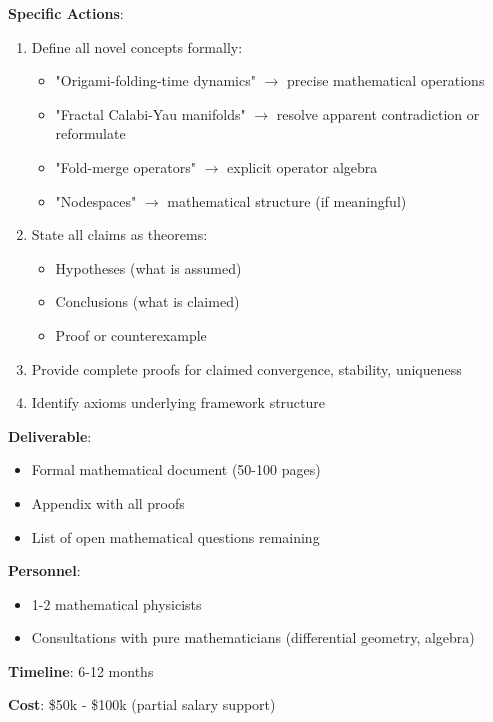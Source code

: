\textbf{Specific Actions}:
\begin{enumerate}
    \item Define all novel concepts formally:
    \begin{itemize}
        \item "Origami-folding-time dynamics" $\to$ precise mathematical operations
        \item "Fractal Calabi-Yau manifolds" $\to$ resolve apparent contradiction or reformulate
        \item "Fold-merge operators" $\to$ explicit operator algebra
        \item "Nodespaces" $\to$ mathematical structure (if meaningful)
    \end{itemize}

    \item State all claims as theorems:
    \begin{itemize}
        \item Hypotheses (what is assumed)
        \item Conclusions (what is claimed)
        \item Proof or counterexample
    \end{itemize}

    \item Provide complete proofs for claimed convergence, stability, uniqueness

    \item Identify axioms underlying framework structure
\end{enumerate}

\textbf{Deliverable}:
\begin{itemize}
    \item Formal mathematical document (50-100 pages)
    \item Appendix with all proofs
    \item List of open mathematical questions remaining
\end{itemize}

\textbf{Personnel}:
\begin{itemize}
    \item 1-2 mathematical physicists
    \item Consultations with pure mathematicians (differential geometry, algebra)
\end{itemize}

\textbf{Timeline}: 6-12 months

\textbf{Cost}: \$50k - \$100k (partial salary support)

